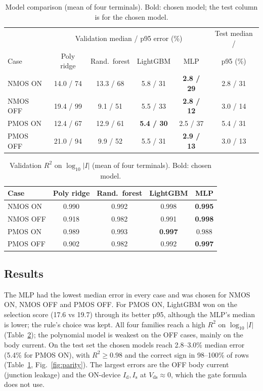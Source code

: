\documentclass[11pt]{article}
\begin{document}
\begin{table}[H]
\centering\small
\begin{tabular}{lcccc|c}
\toprule
 & \multicolumn{4}{c|}{Validation median / p95 error (\%)} & Test median / \\
Case & Poly ridge & Rand.\ forest & LightGBM & MLP & p95 (\%) \\
\midrule
NMOS ON  & 14.0 / 74 & 13.3 / 68 & 5.8 / 31 & \textbf{2.8 / 29} & 2.8 / 31 \\
NMOS OFF & 19.4 / 99 & 9.1 / 51  & 5.5 / 33 & \textbf{2.8 / 12} & 3.0 / 14 \\
PMOS ON  & 12.4 / 67 & 12.9 / 61 & \textbf{5.4 / 30} & 2.5 / 37 & 5.4 / 31 \\
PMOS OFF & 21.0 / 94 & 9.9 / 52  & 5.5 / 31 & \textbf{2.9 / 13} & 3.0 / 13 \\
\bottomrule
\end{tabular}
\caption{Model comparison (mean of four terminals). Bold: chosen model; the
test column is for the chosen model.}
\label{tab:results}
\end{table}

\begin{table}[H]
\centering\small
\begin{tabular}{lcccc}
\toprule
Case & Poly ridge & Rand.\ forest & LightGBM & MLP \\
\midrule
NMOS ON  & 0.990 & 0.992 & 0.998 & \textbf{0.995} \\
NMOS OFF & 0.918 & 0.982 & 0.991 & \textbf{0.998} \\
PMOS ON  & 0.989 & 0.993 & \textbf{0.997} & 0.988 \\
PMOS OFF & 0.902 & 0.982 & 0.992 & \textbf{0.997} \\
\bottomrule
\end{tabular}
\caption{Validation $R^2$ on $\log_{10}|I|$ (mean of four terminals). Bold:
chosen model.}
\label{tab:r2}
\end{table}

\subsection{Results}
The MLP had the lowest median error in every case and was chosen for NMOS ON,
NMOS OFF and PMOS OFF. For PMOS ON, LightGBM won on the selection score (17.6
vs 19.7) through its better p95, although the MLP's median is lower; the
rule's choice was kept. All four families reach a high $R^2$ on
$\log_{10}|I|$ (Table~\ref{tab:r2}); the polynomial model is weakest on the
OFF cases, mainly on the body current. On the test set the chosen models
reach 2.8--3.0\% median error (5.4\% for PMOS ON), with $R^2 \ge 0.98$ and
the correct sign in 98--100\% of rows (Table~\ref{tab:results},
Fig.~\ref{fig:parity}). The largest
errors are the OFF body current (junction leakage) and the ON-device
$I_\mathrm{d}, I_\mathrm{s}$ at $V_\mathrm{ds}\approx0$, which the gate
formula does not use.
\end{document}
